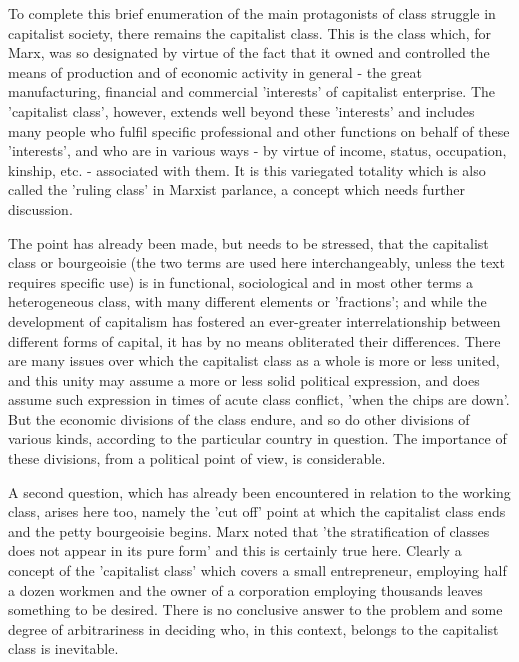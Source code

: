 To complete this brief enumeration of the main protagonists of class struggle in capitalist society, there remains the capitalist class. This is the class which, for Marx, was so designated by virtue of the fact that it owned and controlled the means of production and of economic activity in general - the great manufacturing, financial and commercial 'interests' of capitalist enterprise. The 'capitalist class', however, extends well beyond these 'interests' and includes many people who fulfil specific professional and other functions on behalf of these 'interests', and who are in various ways - by virtue of income, status, occupation, kinship, etc. - associated with them. It is this variegated totality which is also called the 'ruling class' in Marxist parlance, a concept which needs further discussion.

The point has already been made, but needs to be stressed, that the capitalist class or bourgeoisie (the two terms are used here interchangeably, unless the text requires specific use) is in functional, sociological and in most other terms a heterogeneous class, with many different elements or 'fractions'; and while the development of capitalism has fostered an ever-greater interrelationship between different forms of capital, it has by no means obliterated their differences. There are many issues over which the capitalist class as a whole is more or less united, and this unity may assume a more or less solid political expression, and does assume such expression in times of acute class conflict, 'when the chips are down'. But the economic divisions of the class endure, and so do other divisions of various kinds, according to the particular country in question. The importance of these divisions, from a political point of view, is considerable.

A second question, which has already been encountered in relation to the working class, arises here too, namely the 'cut off' point at which the capitalist class ends and the petty bourgeoisie begins. Marx noted that 'the stratification of classes does not appear in its pure form' and this is certainly true here. Clearly a concept of the 'capitalist class' which covers a small entrepreneur, employing half a dozen workmen and the owner of a corporation employing thousands leaves something to be desired. There is no conclusive answer to the problem and some degree of arbitrariness in deciding who, in this context, belongs to the capitalist class is inevitable.

